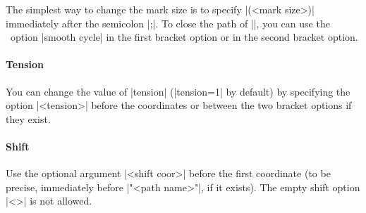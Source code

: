 The simplest way to change the mark size is to specify |(<mark size>)| immediately after the semicolon |;|.
To close the path of |\tzplotcurve|, you can use the \Tikz\ option |smooth cycle| in the first bracket option or in the second bracket option.

\begin{tzcode}{.3}
\end{tzcode}

\begin{tzcode}{.3}
\end{tzcode}

\paragraph{Tension}
You can change the value of |tension| (|tension=1| by default) by specifying the option |{<tension>}| before the coordinates or between the two bracket options if they exist.

\begin{tzcode}{.3}
\end{tzcode}


\paragraph{Shift} Use the optional argument |<shift coor>| before the first coordinate (to be precise, immediately before |"<path name>"|, if it exists).
The empty shift option |<>| is not allowed.

\begin{tzcode}{.3}
\end{tzcode}


